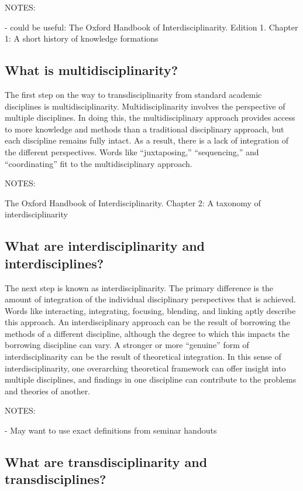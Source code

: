 \documentclass{lps}
\begin{document}
NOTES:

- could be useful: The Oxford Handbook of Interdisciplinarity. Edition 1.
Chapter 1: A short history of knowledge formations

\subsection{What is multidisciplinarity?}

The first step on the way to transdisciplinarity from standard academic
disciplines is multidisciplinarity. Multidisciplinarity involves the
perspective of multiple disciplines. In doing this, the multidisciplinary
approach provides access to more knowledge and methods than a traditional
disciplinary approach, but each discipline remains fully intact. As a result,
there is a lack of integration of the different perspectives. Words like
“juxtaposing,” “sequencing,” and “coordinating” fit to the multidisciplinary
approach.

NOTES:

The Oxford Handbook of Interdisciplinarity. Chapter 2: A taxonomy of interdisciplinarity

\subsection{What are interdisciplinarity and interdisciplines?}

The next step is known as interdisciplinarity. The primary difference is the
amount of integration of the individual disciplinary perspectives that is
achieved. Words like interacting, integrating, focusing, blending, and linking
aptly describe this approach. An interdisciplinary approach can be the result
of borrowing the methods of a different discipline, although the degree to
which this impacts the borrowing discipline can vary. A stronger or more
“genuine” form of interdisciplinarity can be the result of theoretical
integration. In this sense of interdisciplinarity, one overarching theoretical
framework can offer insight into multiple disciplines, and findings in one
discipline can contribute to the problems and theories of another.

NOTES:

- May want to use exact definitions from seminar handouts

\subsection{What are transdisciplinarity and transdisciplines?}
\end{document}
